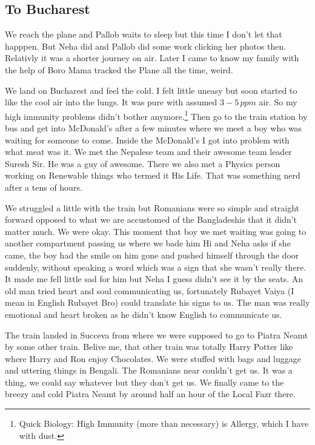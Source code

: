 \documentclass[11pt,a4paper]{article}
\begin{document}
\subsection{To Bucharest}
We reach the plane and Pallob waits to sleep but this time I don't let that happpen. But Neha did and Pallob did some work clicking her photos then. Relativly it was a shorter journey on air. Later I came to know my family with the help of Boro Mama tracked the Plane all the time, weird. 

We land on Bucharest and feel the cold. I felt little uneasy but soon started to like the cool air into the lungs. It was pure with assumed $3-5 \, ppm$ air. So my high immunity problems didn't bother anymore.\footnote{Quick Biology: High Immunity (more than necessary) is Allergy, which I have with dust.} Then go to the train station by bus and get into McDonald's after a few minutes where we meet a boy who was waiting for someone to come. Inside the McDonald's I got into problem with what meat was it. We met the Nepalese team and their awesome team leader Suresh Sir. He was a guy of awesome. There we also met a Physics person working on Renewable things who termed it His Life. That was something nerd after a tens of hours. 

We struggled a little with the train but Romanians were so simple and straight forward opposed to what we are accustomed of the Bangladeshis that it didn't matter much. We were okay. This moment that boy we met waiting was going to another compartment passing us where we bade him Hi and Neha asks if she came, the boy had the smile on him gone and pushed himself through the door suddenly, without speaking a word which was a sign that she wasn't really there. It made me fell little sad for him but Neha I guess didn't see it by the seats. An old man tried heart and soul communicating us, fortunately Rubayet Vaiya (I mean in English Rubayet Bro) could translate his signs to us. The man was really emotional and heart broken as he didn't know English to communicate us.  

The train landed in Succeva from where we were supposed to go to Piatra Neamt by some other train. Belive me, that other train was totally Harry Potter like where Harry and Ron enjoy Chocolates. We were stuffed with bags and luggage and uttering things in Bengali. The Romanians near couldn't get us. It was a thing, we could say whatever but they don't get us. We finally came to the breezy and cold Piatra Neamt by around half an hour of the Local Fazr there.
\end{document}
